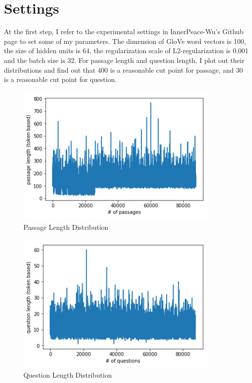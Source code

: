 \documentclass[modernstyle,12pt]{sjsuthesis}
\theoremstyle{definition}
\begin{document}
\section{Settings}
At the first step, I refer to the experimental settings in InnerPeace-Wu's Github page to set some of my parameters. The dimension of GloVe word vectors is 100, the size of hidden units is 64, the regularization scale of L2-regularization is 0.001 and the batch size is 32. For passage length and question length, I plot out their distributions and find out that 400 is a reasonable cut point for passage, and 30 is a reasonable cut point for question.


\begin{figure}[htbp]\centering
  \includegraphics[width=10cm, height=7cm]{figures/passage_length.png}
  \caption{Passage Length Distribution}
  \label{f:passage_length}
\end{figure}

\begin{figure}[htbp]\centering
  \includegraphics[width=10cm, height=7cm]{figures/question_length.png}
  \caption{Question Length Distribution}
  \label{f:question_length}
\end{figure}
\end{document}
